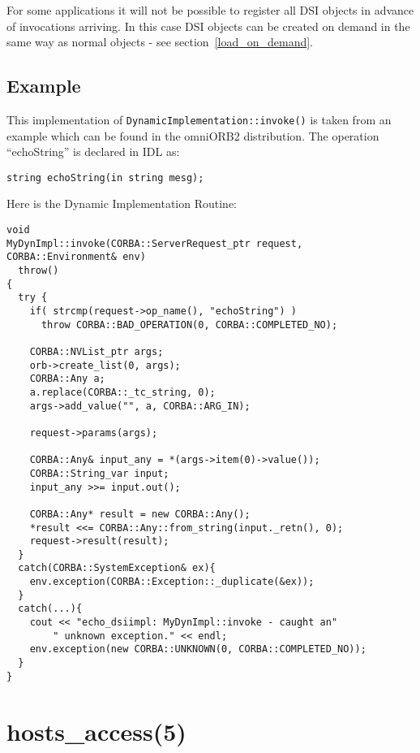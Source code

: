 \documentclass[11pt,twoside,onecolumn]{book}
\begin{document}
For some applications it will not be possible to register all DSI objects
in advance of invocations arriving. In this case DSI objects can be
created on demand in the same way as normal objects - see
section~\ref{load_on_demand}.


\section{Example}

This implementation of {\tt DynamicImplementation::invoke()} is taken from
an example which can be found in the omniORB2 distribution. The operation
``echoString'' is declared in IDL as:

{\small \begin{verbatim}
string echoString(in string mesg);
\end{verbatim}}

\noindent{}Here is the Dynamic Implementation Routine:

{\small \begin{verbatim}
void
MyDynImpl::invoke(CORBA::ServerRequest_ptr request, CORBA::Environment& env)
  throw()
{
  try {
    if( strcmp(request->op_name(), "echoString") )
      throw CORBA::BAD_OPERATION(0, CORBA::COMPLETED_NO);

    CORBA::NVList_ptr args;
    orb->create_list(0, args);
    CORBA::Any a;
    a.replace(CORBA::_tc_string, 0);
    args->add_value("", a, CORBA::ARG_IN);

    request->params(args);

    CORBA::Any& input_any = *(args->item(0)->value());
    CORBA::String_var input;
    input_any >>= input.out();

    CORBA::Any* result = new CORBA::Any();
    *result <<= CORBA::Any::from_string(input._retn(), 0);
    request->result(result);
  }
  catch(CORBA::SystemException& ex){
    env.exception(CORBA::Exception::_duplicate(&ex));
  }
  catch(...){
    cout << "echo_dsiimpl: MyDynImpl::invoke - caught an"
        " unknown exception." << endl;
    env.exception(new CORBA::UNKNOWN(0, CORBA::COMPLETED_NO));
  }
}
\end{verbatim}}



\appendix
\chapter{hosts\_access(5)}
\end{document}
